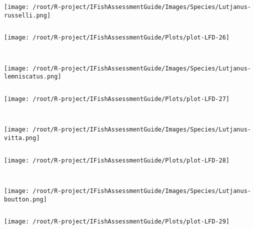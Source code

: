 \documentclass{report}\usepackage[]{graphicx}\usepackage[]{color}
\makeatletter
\def\maxwidth{ %
  \ifdim\Gin@nat@width>\linewidth
    \linewidth
  \else
    \Gin@nat@width
  \fi
}
\newenvironment{kframe}{%
 \def\at@end@of@kframe{}%
 \ifinner\ifhmode%
  \def\at@end@of@kframe{\end{minipage}}%
  \begin{minipage}{\columnwidth}%
 \fi\fi%
 \def\FrameCommand##1{\hskip\@totalleftmargin \hskip-\fboxsep
 \colorbox{shadecolor}{##1}\hskip-\fboxsep
     \hskip-\linewidth \hskip-\@totalleftmargin \hskip\columnwidth}%
 \MakeFramed {\advance\hsize-\width
   \@totalleftmargin\z@ \linewidth\hsize
   \@setminipage}}%
 {\par\unskip\endMakeFramed%
 \at@end@of@kframe}
\newenvironment{knitrout}{}{} %
\makeatother
\begin{document}
\begin{knitrout}
\begin{kframe}
\begin{verbatim}
\end{verbatim}
\end{kframe}
\texttt{[image: /root/R-project/IFishAssessmentGuide/Images/Species/Lutjanus-russelli.png]}
\begin{kframe}\begin{verbatim}
\end{verbatim}
\end{kframe}
\texttt{[image: /root/R-project/IFishAssessmentGuide/Plots/plot-LFD-26]} 
\begin{kframe}\begin{verbatim}
 
\end{verbatim}
\end{kframe}
\texttt{[image: /root/R-project/IFishAssessmentGuide/Images/Species/Lutjanus-lemniscatus.png]}
\begin{kframe}\begin{verbatim}
\end{verbatim}
\end{kframe}
\texttt{[image: /root/R-project/IFishAssessmentGuide/Plots/plot-LFD-27]} 
\begin{kframe}\begin{verbatim}
 
\end{verbatim}
\end{kframe}
\texttt{[image: /root/R-project/IFishAssessmentGuide/Images/Species/Lutjanus-vitta.png]}
\begin{kframe}\begin{verbatim}
\end{verbatim}
\end{kframe}
\texttt{[image: /root/R-project/IFishAssessmentGuide/Plots/plot-LFD-28]} 
\begin{kframe}\begin{verbatim}
 
\end{verbatim}
\end{kframe}
\texttt{[image: /root/R-project/IFishAssessmentGuide/Images/Species/Lutjanus-boutton.png]}
\begin{kframe}\begin{verbatim}
\end{verbatim}
\end{kframe}
\texttt{[image: /root/R-project/IFishAssessmentGuide/Plots/plot-LFD-29]} 
\begin{kframe}\begin{verbatim}
 

\end{verbatim}
\end{kframe}
\end{knitrout}
\end{document}
